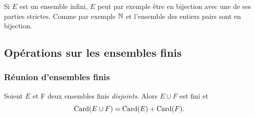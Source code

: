 Si \(E\) est un ensemble infini, \(E\) peut par exemple être en bijection avec une de ses parties strictes. Comme par exemple \(\mathbb{N}\) et l'ensemble des entiers pairs sont en bijection.

\subsection{Opérations sur les ensembles finis}

\subsubsection{Réunion d'ensembles finis}

\begin{prop}\label{prop:reunionfindis}
  Soient \(E\) et F deux ensembles finis \emph{disjoints}. Alors \(E\cup F\) est fini et 
  \begin{equation}
    \operatorname{Card}(E\cup F)=\operatorname{Card}(E)+\operatorname{Card}(F).
  \end{equation}
\end{prop}

